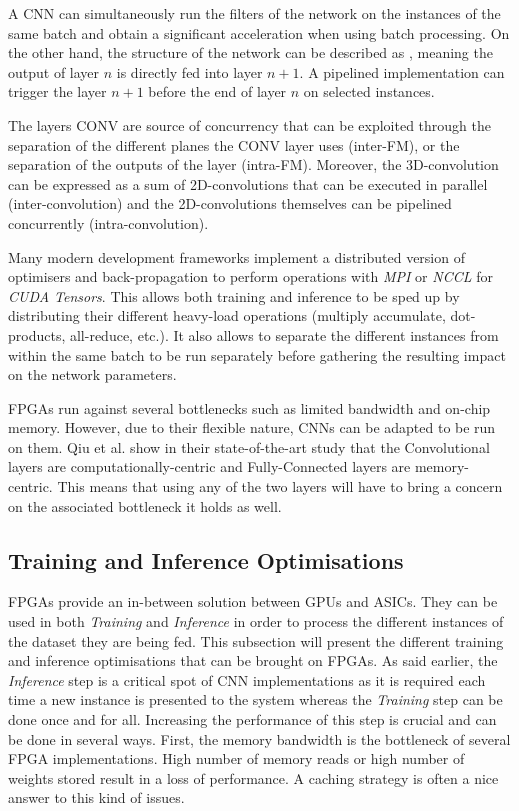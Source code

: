 A CNN can simultaneously run the filters of the network on the instances of the same batch and obtain a significant acceleration when using batch processing. On the other hand, the structure of the network can be described as , meaning the output of layer $n$ is directly fed into layer $n+1$. A pipelined implementation can trigger the layer $n+1$ before the end of layer $n$ on selected instances.

The layers CONV are source of concurrency that can be exploited through the separation of the different planes the CONV layer uses (inter-FM), or the separation of the outputs of the layer (intra-FM). Moreover, the 3D-convolution can be expressed as a sum of 2D-convolutions that can be executed in parallel (inter-convolution) and the 2D-convolutions themselves can be pipelined concurrently (intra-convolution).

Many modern development frameworks implement a distributed version of optimisers and back-propagation to perform operations with \emph{MPI} or \emph{NCCL} for \emph{CUDA Tensors}. This allows both training and inference to be sped up by distributing their different heavy-load operations (multiply accumulate, dot-products, all-reduce, etc.). It also allows to separate the different instances from within the same batch to be run separately before gathering the resulting impact on the network parameters.

FPGAs run against several bottlenecks such as limited bandwidth and on-chip memory. However, due to their flexible nature, CNNs can be adapted to be run on them. Qiu et al. \cite{Qiu2016} show in their state-of-the-art study that the Convolutional layers are computationally-centric and Fully-Connected layers are memory-centric. This means that using any of the two layers will have to bring a concern on the associated bottleneck it holds as well.


\subsection{Training and Inference Optimisations}

FPGAs provide an in-between solution between GPUs and ASICs. They can be used in both \emph{Training} and \emph{Inference} in order to process the different instances of the dataset they are being fed. This subsection will present the different training and inference optimisations that can be brought on FPGAs. As said earlier, the \emph{Inference} step is a critical spot of CNN implementations as it is required each time a new instance is presented to the system whereas the \emph{Training} step can be done once and for all. Increasing the performance of this step is crucial and can be done in several ways. First, the memory bandwidth is the bottleneck of several FPGA implementations. High number of memory reads or high number of weights stored result in a loss of performance. A caching strategy is often a nice answer to this kind of issues.


